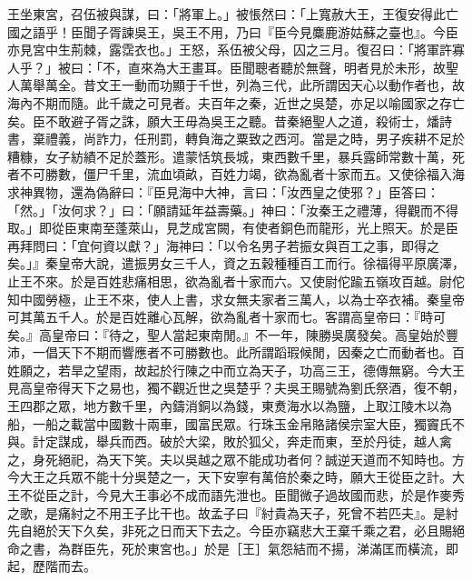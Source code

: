 \begin{pinyinscope}
王坐東宮，召伍被與謀，曰：「將軍上。」被悵然曰：「上寬赦大王，王復安得此亡國之語乎！臣聞子胥諫吳王，吳王不用，乃曰『臣今見麋鹿游姑蘇之臺也』。今臣亦見宮中生荊棘，露霑衣也。」王怒，系伍被父母，囚之三月。復召曰：「將軍許寡人乎？」被曰：「不，直來為大王畫耳。臣聞聰者聽於無聲，明者見於未形，故聖人萬舉萬全。昔文王一動而功顯于千世，列為三代，此所謂因天心以動作者也，故海內不期而隨。此千歲之可見者。夫百年之秦，近世之吳楚，亦足以喻國家之存亡矣。臣不敢避子胥之誅，願大王毋為吳王之聽。昔秦絕聖人之道，殺術士，燔詩書，棄禮義，尚詐力，任刑罰，轉負海之粟致之西河。當是之時，男子疾耕不足於糟糠，女子紡績不足於蓋形。遣蒙恬筑長城，東西數千里，暴兵露師常數十萬，死者不可勝數，僵尸千里，流血頃畝，百姓力竭，欲為亂者十家而五。又使徐福入海求神異物，還為偽辭曰：『臣見海中大神，言曰：「汝西皇之使邪？」臣答曰：「然。」「汝何求？」曰：「願請延年益壽藥。」神曰：「汝秦王之禮薄，得觀而不得取。」即從臣東南至蓬萊山，見芝成宮闕，有使者銅色而龍形，光上照天。於是臣再拜問曰：「宜何資以獻？」海神曰：「以令名男子若振女與百工之事，即得之矣。」』秦皇帝大說，遣振男女三千人，資之五穀種種百工而行。徐福得平原廣澤，止王不來。於是百姓悲痛相思，欲為亂者十家而六。又使尉佗踰五嶺攻百越。尉佗知中國勞極，止王不來，使人上書，求女無夫家者三萬人，以為士卒衣補。秦皇帝可其萬五千人。於是百姓離心瓦解，欲為亂者十家而七。客謂高皇帝曰：『時可矣。』高皇帝曰：『待之，聖人當起東南閒。』不一年，陳勝吳廣發矣。高皇始於豐沛，一倡天下不期而響應者不可勝數也。此所謂蹈瑕候閒，因秦之亡而動者也。百姓願之，若旱之望雨，故起於行陳之中而立為天子，功高三王，德傳無窮。今大王見高皇帝得天下之易也，獨不觀近世之吳楚乎？夫吳王賜號為劉氏祭酒，復不朝，王四郡之眾，地方數千里，內鑄消銅以為錢，東煑海水以為鹽，上取江陵木以為船，一船之載當中國數十兩車，國富民眾。行珠玉金帛賂諸侯宗室大臣，獨竇氏不與。計定謀成，舉兵而西。破於大梁，敗於狐父，奔走而東，至於丹徒，越人禽之，身死絕祀，為天下笑。夫以吳越之眾不能成功者何？誠逆天道而不知時也。方今大王之兵眾不能十分吳楚之一，天下安寧有萬倍於秦之時，願大王從臣之計。大王不從臣之計，今見大王事必不成而語先泄也。臣聞微子過故國而悲，於是作麥秀之歌，是痛紂之不用王子比干也。故孟子曰『紂貴為天子，死曾不若匹夫』。是紂先自絕於天下久矣，非死之日而天下去之。今臣亦竊悲大王棄千乘之君，必且賜絕命之書，為群臣先，死於東宮也。」於是［王］氣怨結而不揚，涕滿匡而橫流，即起，歷階而去。


\end{pinyinscope}
